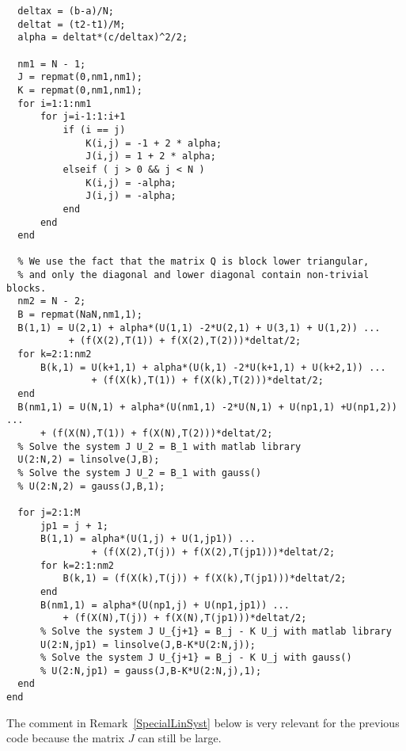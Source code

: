 \begin{code}
\begin{verbatim}
  deltax = (b-a)/N;
  deltat = (t2-t1)/M;
  alpha = deltat*(c/deltax)^2/2;

  nm1 = N - 1;
  J = repmat(0,nm1,nm1);
  K = repmat(0,nm1,nm1);
  for i=1:1:nm1
      for j=i-1:1:i+1
          if (i == j)
              K(i,j) = -1 + 2 * alpha;
              J(i,j) = 1 + 2 * alpha;
          elseif ( j > 0 && j < N )
              K(i,j) = -alpha;
              J(i,j) = -alpha;
          end
      end
  end

  % We use the fact that the matrix Q is block lower triangular,
  % and only the diagonal and lower diagonal contain non-trivial blocks.
  nm2 = N - 2;
  B = repmat(NaN,nm1,1);
  B(1,1) = U(2,1) + alpha*(U(1,1) -2*U(2,1) + U(3,1) + U(1,2)) ...
           + (f(X(2),T(1)) + f(X(2),T(2)))*deltat/2;
  for k=2:1:nm2
      B(k,1) = U(k+1,1) + alpha*(U(k,1) -2*U(k+1,1) + U(k+2,1)) ...
               + (f(X(k),T(1)) + f(X(k),T(2)))*deltat/2;
  end
  B(nm1,1) = U(N,1) + alpha*(U(nm1,1) -2*U(N,1) + U(np1,1) +U(np1,2)) ...
      + (f(X(N),T(1)) + f(X(N),T(2)))*deltat/2;
  % Solve the system J U_2 = B_1 with matlab library
  U(2:N,2) = linsolve(J,B);
  % Solve the system J U_2 = B_1 with gauss()
  % U(2:N,2) = gauss(J,B,1);

  for j=2:1:M
      jp1 = j + 1;
      B(1,1) = alpha*(U(1,j) + U(1,jp1)) ...
               + (f(X(2),T(j)) + f(X(2),T(jp1)))*deltat/2;
      for k=2:1:nm2
          B(k,1) = (f(X(k),T(j)) + f(X(k),T(jp1)))*deltat/2;
      end
      B(nm1,1) = alpha*(U(np1,j) + U(np1,jp1)) ...
          + (f(X(N),T(j)) + f(X(N),T(jp1)))*deltat/2;
      % Solve the system J U_{j+1} = B_j - K U_j with matlab library
      U(2:N,jp1) = linsolve(J,B-K*U(2:N,j));
      % Solve the system J U_{j+1} = B_j - K U_j with gauss()
      % U(2:N,jp1) = gauss(J,B-K*U(2:N,j),1);
  end
end
\end{verbatim}
\end{code}

The comment in Remark~\ref{SpecialLinSyst} below is very
relevant for the previous code because the matrix $J$ can still be
large.

